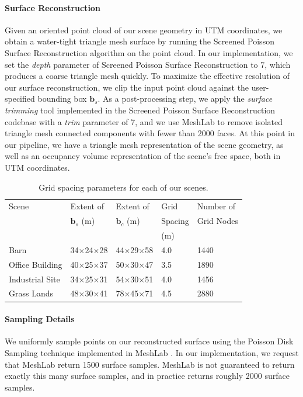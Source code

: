 \paragraph{Surface Reconstruction}
Given an oriented point cloud of our scene geometry in UTM coordinates, we obtain a water-tight triangle mesh surface by running the Screened Poisson Surface Reconstruction algorithm \cite{kazhdan:2013} on the point cloud.
In our implementation, we set the \emph{depth} parameter of Screened Poisson Surface Reconstruction to 7, which produces a coarse triangle mesh quickly.
To maximize the effective resolution of our surface reconstruction, we clip the input point cloud against the user-specified bounding box $\mathbf{b}_s$.
As a post-processing step, we apply the \emph{surface trimming} tool implemented in the Screened Poisson Surface Reconstruction codebase with a \emph{trim} parameter of 7, and we use MeshLab \cite{cignoni:2008} to remove isolated triangle mesh connected components with fewer than 2000 faces.
At this point in our pipeline, we have a triangle mesh representation of the scene geometry, as well as an occupancy volume representation of the scene's free space, both in UTM coordinates.

\begin{table}[t]
\centering
\footnotesize
\begin{tabular}{@{}lllll@{}}
\toprule
Scene           & Extent of              & Extent of              & Grid    & Number of  \\
                & $\mathbf{b}_s$ (m)     & $\mathbf{b}_c$ (m)     & Spacing & Grid Nodes \\
                &                        &                        & (m)     & \\
\midrule
Barn            & 34$\times$24$\times$28 & 44$\times$29$\times$58 & 4.0     & 1440 \\
Office Building & 40$\times$25$\times$37 & 50$\times$30$\times$47 & 3.5     & 1890 \\
Industrial Site & 34$\times$25$\times$31 & 54$\times$30$\times$51 & 4.0     & 1456 \\
Grass Lands     & 48$\times$30$\times$41 & 78$\times$45$\times$71 & 4.5     & 2880 \\
\bottomrule
\end{tabular}
\normalsize
\caption{
Grid spacing parameters for each of our scenes.
}
\label{tbl:ch4:grid}
\end{table}

\paragraph{Sampling Details}
We uniformly sample points on our reconstructed surface using the Poisson Disk Sampling technique \cite{corsini:2012} implemented in MeshLab \cite{cignoni:2008}.
In our implementation, we request that MeshLab return 1500 surface samples.
MeshLab is not guaranteed to return exactly this many surface samples, and in practice returns roughly 2000 surface samples.

